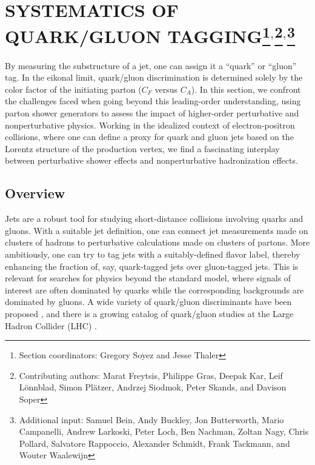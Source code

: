 \documentclass[11pt]{cernrep}
\begin{document}
\section{SYSTEMATICS OF QUARK/GLUON TAGGING\protect\footnote{Section coordinators: Gregory Soyez and Jesse Thaler}$^{,}$\protect\footnote{Contributing authors: Marat Freytsis, Philippe Gras, Deepak Kar, Leif L\"onnblad, Simon Pl\"atzer, Andrzej Siodmok, Peter Skands, and Davison Soper}$^{,}$\protect\footnote{Additional input: Samuel Bein, Andy Buckley, Jon Butterworth, Mario Campanelli, Andrew Larkoski, Peter Loch, Ben Nachman, Zoltan Nagy, Chris Pollard, Salvatore Rappoccio, Alexander Schmidt, Frank Tackmann, and Wouter Waalewijn}}

By measuring the substructure of a jet, one can assign it a ``quark'' or ``gluon'' tag.  In the eikonal limit, quark/gluon discrimination is determined solely by the color factor of the initiating parton ($C_F$ versus $C_A$).  In this section, we confront the challenges faced when going beyond this leading-order understanding, using parton shower generators to assess the impact of higher-order perturbative and nonperturbative physics.  Working in the idealized context of electron-positron collisions, where one can define a proxy for quark and gluon jets based on the Lorentz structure of the production vertex, we find a fascinating interplay between perturbative shower effects and nonperturbative hadronization effects.

\subsection{Overview}
\label{quarkgluon_sec:overview}

Jets are a robust tool for studying short-distance collisions involving quarks and gluons.  With a suitable jet definition, one can connect jet measurements made on clusters of hadrons to perturbative calculations made on clusters of partons.  More ambitiously, one can try to tag jets with a suitably-defined flavor label, thereby enhancing the fraction of, say, quark-tagged jets over gluon-tagged jets.  This is relevant for searches for physics beyond the standard model, where signals of interest are often dominated by quarks while the corresponding backgrounds are dominated by gluons.  A wide variety of quark/gluon discriminants have been proposed \cite{Gallicchio:2011xq,Gallicchio:2012ez,Krohn:2012fg,Pandolfi:1480598,Chatrchyan:2012sn,Larkoski:2013eya,Larkoski:2014pca,Bhattacherjee:2015psa}, and there is a growing catalog of quark/gluon studies at the Large Hadron Collider (LHC) \cite{Aad:2014gea,Aad:2014bia,Khachatryan:2014dea,Aad:2015owa,Khachatryan:2015bnx,Aad:2016oit}.
\end{document}
